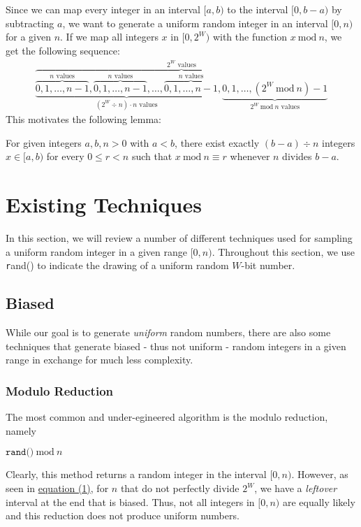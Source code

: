 \documentclass[a4paper, UKenglish, cleveref, autoref, thm-restate]{lipics-v2021}
\newcommand{\Mod}[1]{\ \mathrm{mod}\ #1}
\begin{document}
Since we can map every integer in an interval $[a,b)$ to the interval $[0,b - a)$ by subtracting $a$, we want to generate a uniform random integer in an interval $[0,n)$ for a given $n$.
If we map all integers $x$ in $[0,2^W)$ with the function $x \Mod n$, we get the following sequence:
{\large
\begin{align}\label{eq:1}
    \overbrace{\underbrace{\overbrace{0,1,\ldots,n - 1}^{\text{$n$ values}},\overbrace{0,1,\ldots,n - 1}^{\text{$n$ values}},\ldots,\overbrace{0,1,\ldots,n - 1}^{\text{$n$ values}}}_{\text{$\left(2^W \div n\right) \cdot n$ values}},\underbrace{0,1,\ldots,\left(2^W \Mod n\right) - 1}_{\text{$2^W \Mod n$ values}}}^{\text{$2^W$ values}}
\end{align}
}%
This motivates the following lemma:
\begin{lemma} \label{lemma:1}
    For given integers $a,b,n > 0$ with $a < b$, there exist exactly $(b - a) \div n$ integers $x \in [a,b)$ for every $0 \leq r < n$ such that $x \Mod n \equiv r$ whenever $n$ divides $b - a$.
\end{lemma}




\section{Existing Techniques}\label{sec:2}
In this section, we will review a number of different techniques used for sampling a uniform random integer in a given range $[0,n)$.
Throughout this section, we use {\texttt rand()} to indicate the drawing of a uniform random $W$-bit number.

\subsection{Biased}
While our goal is to generate \emph{uniform} random numbers, there are also some techniques that generate biased - thus not uniform - random integers in a given range in exchange for much less complexity.

\subsubsection{Modulo Reduction}\label{sec:2.1.1}
The most common and under-egineered algorithm is the modulo reduction, namely
\begin{center}
    $\texttt{rand()} \Mod n$
\end{center}
Clearly, this method returns a random integer in the interval $[0,n)$.
However, as seen in \hyperref[eq:1]{equation (1)}, for $n$ that do not perfectly divide $2^W$, we have a \emph{leftover} interval at the end that is biased.
Thus, not all integers in $[0,n)$ are equally likely and this reduction does not produce uniform numbers.
\end{document}
